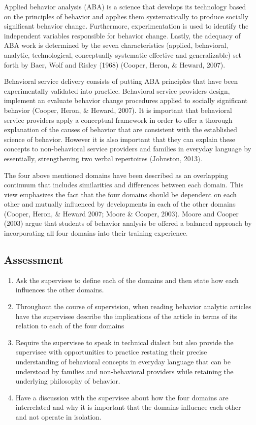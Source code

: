 Applied behavior analysis (ABA) is a science that develops its technology based on the principles of behavior and applies them systematically to produce socially significant behavior change. Furthermore, experimentation is used to identify the independent variables responsible for behavior change. Lastly, the adequacy of ABA work is determined by the seven characteristics (applied, behavioral, analytic, technological, conceptually systematic effective and generalizable) set forth by Baer, Wolf and Risley (1968) (Cooper, Heron, \& Heward, 2007). 

Behavioral service delivery consists of putting ABA principles that have been experimentally validated into practice.  Behavioral service providers design, implement an evaluate behavior change procedures applied to socially significant behavior (Cooper, Heron, \& Heward, 2007). It is important that behavioral service providers apply a conceptual framework in order to offer a thorough explanation of the causes of behavior that are consistent with the established science of behavior. However it is also important that they can explain these concepts to non-behavioral service providers and families in everyday language by essentially, strengthening two verbal repertoires (Johnston, 2013). 

The four above mentioned domains have been described as an overlapping continuum that includes similarities and differences between each domain. This view emphasizes the fact that the four domains should be dependent on each other and mutually influenced by developments in each of the other domains (Cooper, Heron, \& Heward 2007; Moore \& Cooper, 2003). Moore and Cooper (2003) argue that students of behavior analysis be offered a balanced approach by incorporating all four domains into their training experience. 
%
%
%
\subsection{Assessment}
\begin{enumerate}
\item Ask the supervisee to define each of the domains and then state how each influences the other domains. 
\item Throughout the course of supervision, when reading behavior analytic articles have the supervisee describe the implications of the article in terms of its relation to each of the four domains 
\item Require the supervisee to speak in technical dialect but also provide the supervisee with opportunities to practice restating their precise understanding of behavioral concepts in everyday language that can be understood by families and non-behavioral providers while retaining the underlying philosophy of behavior. 
\item Have a discussion with the supervisee about how the four domains are interrelated and why it is important that the domains influence each other and not operate in isolation.  
\end{enumerate}
%
